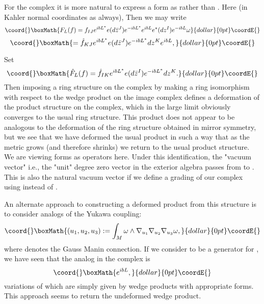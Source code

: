 \documentclass[a4paper,11pt]{amsart}
\begin{document}
  For the \coordHE{} complex it is more natural to express 
  a form \coordHE{} as  \coordHE{} rather than 
  \coordHE{}. Here (in Kahler normal
  coordinates as always), \coordHE{} Then we may write 
$$\coord{}\boxMath{F_L(f) =
f_{IJ}e^{ibL^*}e(d\bar{z}^J)e^{-ibL^*}e^{ibL}e^*(dz^I)e^{-ibL}\omega}{dollar}{0pt}\coordE{}$$  $$\coord{}\boxMath{ =
\hat f_{KJ}e^{ibL^*}e(d\bar{z}^J)e^{-ibL^*}dz^Ke^{ibL},}{dollar}{0pt}\coordE{}$$ 

Set 
$$\coord{}\boxMath{\hat F_L(f) = \hat f_{IK}e^{ibL^*}e(d\bar{z}^I)e^{-ibL^*}dz^K.}{dollar}{0pt}\coordE{}$$
Then imposing a ring structure on the \coordHE{} complex by making 
\coordHE{} a ring isomorphism with respect to the wedge product on the image
complex defines a deformation of the product structure on the \coordHE{} complex, which 
in the large \coordHE{} limit obviously converges to the usual ring structure. This product does not appear to be
analogous to the deformation of the ring structure obtained in mirror symmetry, 
but we see that we have deformed
the usual product in such a way that as the metric grows (and 
therefore \coordHE{} shrinks) we return to the usual product structure. We are 
viewing forms as operators here. Under this identification, the "vacuum vector" 
i.e., the "unit" degree zero vector in the exterior algebra passes from 
\coordHE{} to \coordHE{}. This is also the natural vacuum vector if we 
define a grading of our complex using \coordHE{} instead of \coordHE{}. 


An alternate approach to constructing a deformed product from this structure is
to consider analogs of the Yukawa coupling:
$$\coord{}\boxMath{(u_1,u_2,u_3):=
\int_M\omega\wedge\nabla_{u_1}\nabla_{u_2}\nabla_{u_3}\omega,}{dollar}{0pt}\coordE{}$$
where \myHighlight{$\nabla$}\coordHE{} denotes the Gauss Manin connection. 
If we consider \myHighlight{$\omega$}\coordHE{} to be a generator for \coordHE{}, we have seen that 
the analog in the \coordHE{} complex is 
$$\coord{}\boxMath{e^{ibL},}{dollar}{0pt}\coordE{}$$ 
variations of which are simply given by wedge products with appropriate forms. 
This approach seems to return the undeformed wedge product. 
\end{document}
